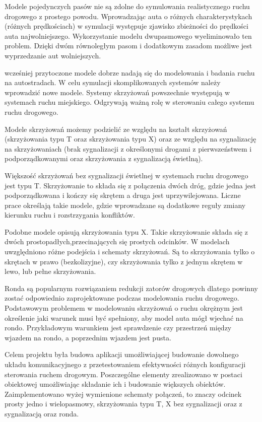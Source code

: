 \documentclass{article}
\begin{document}
Modele pojedynczych pasów nie są zdolne do symulowania realistycznego ruchu drogowego z prostego powodu. Wprowadzając auta o różnych charakterystykach (różnych prędkościach) w symulacji występuje zjawisko zbieżności do prędkości auta najwolniejszego. Wykorzystanie modelu dwupasmowego wyeliminowało ten problem. Dzięki dwóm równoległym pasom i dodatkowym zasadom możliwe jest wyprzedzanie aut wolniejszych. \cite{rickert1996two}

wcześniej przytoczone modele dobrze nadają się do modelowania i badania ruchu na autostradach. W celu symulacji skomplikowanych systemów należy wprowadzić nowe modele. Systemy skrzyżowań powszechnie występują w systemach ruchu miejskiego. Odgrywają ważną rolę w sterowaniu całego systemu ruchu drogowego. \cite{wu2005study}

Modele skrzyżowań możemy podzielić ze względu na kształt skrzyżowań (skrzyżowania typu T oraz skrzyżowania typu X) oraz ze względu na sygnalizację na skrzyżowaniach (brak sygnalizacji z określonymi drogami z pierwszeństwem i podporządkowanymi oraz skrzyżowania z sygnalizacją świetlną).

Większość skrzyżowań bez sygnalizacji świetlnej w systemach ruchu drogowego jest typu T. \cite{wu2005study} Skrzyżowanie to składa się z połączenia dwóch dróg, gdzie jedna jest podporządkowana i kończy się skrętem a druga jest uprzywilejowana. Liczne prace określają takie modele, gdzie wprowadzane są dodatkowe reguły zmiany kierunku ruchu i rozstrzygania konfliktów.  \cite{wu2005study, li2009cellular}

Podobne modele opisują skrzyżowania typu X. Takie skrzyżowanie składa się z dwóch prostopadłych,przecinających się prostych odcinków. W modelach uwzględniono różne podejścia i schematy skrzyżowań. Są to skrzyżowania tylko o skrętach w prawo (bezkolizyjne), czy skrzyżowania tylko z jednym skrętem w lewo, lub pełne skrzyżowania. \cite{marzoug2014cellular}

Ronda są popularnym rozwiązaniem redukcji zatorów drogowych dlatego powinny zostać odpowiednio zaprojektowane podczas modelowania ruchu drogowego. \cite{marzoug2014cellular} Podstawowym problemem w modelowaniu skrzyżowań o ruchu okrężnym jest określenie jaki warunek musi być spełniony, aby model auta mógł wjechać na rondo. \cite{campari2004cellular} Przykładowym warunkiem jest sprawdzenie czy przestrzeń między wjazdem na rondo, a poprzednim wjazdem jest pusta. \cite{campari2004cellular, wang2005realistic}

Celem projektu była budowa aplikacji umożliwiającej budowanie dowolnego układu komunikacyjnego z przetestowaniem efektywności różnych konfiguracji sterowania ruchem drogowym. Poszczególne elementy zrealizowano w postaci obiektowej umożliwiając składanie ich i budowanie większych obiektów. Zaimplementowano wyżej wymienione schematy połączeń, to znaczy odcinek prosty jedno i wielopasmowy, skrzyżowania typu T, X bez sygnalizacji oraz z sygnalizacją oraz ronda.
\end{document}
